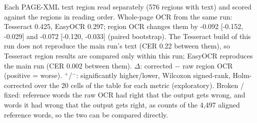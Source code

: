 \begin{table}[t]
\begin{tabular}{lcccccccc}
\bottomrule
\end{tabular}
\par\smallskip
\begin{minipage}{\linewidth}\footnotesize Each PAGE-XML text region read separately (576 regions with text) and scored against the regions in reading order. Whole-page OCR from the same run: Tesseract 0.425, EasyOCR 0.297; region OCR changes them by -0.092 [-0.152, -0.029] and -0.072 [-0.120, -0.033] (paired bootstrap). The Tesseract build of this run does not reproduce the main run's text (CER 0.22 between them), so Tesseract region results are compared only within this run; EasyOCR reproduces the main run (CER 0.002 between them). $\Delta$: corrected $-$ raw region OCR (positive = worse). $^{+}$/$^{-}$: significantly higher/lower, Wilcoxon signed-rank, Holm-corrected over the 20 cells of the table for each metric (exploratory). Broken / fixed: reference words the raw OCR had right that the output gets wrong, and words it had wrong that the output gets right, as counts of the 4{,}497 aligned reference words, so the two can be compared directly.\end{minipage}
\end{table}
